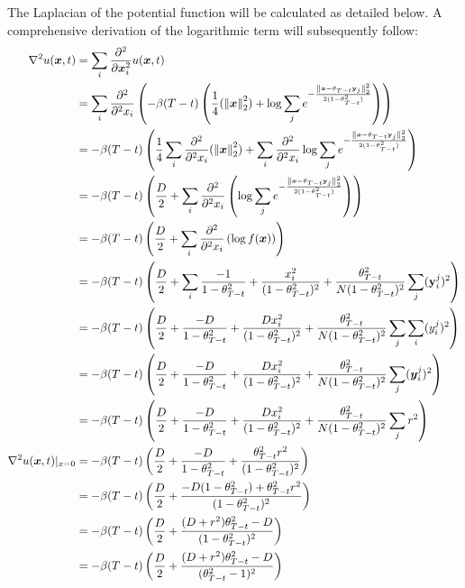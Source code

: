 The Laplacian of the potential function will be calculated as detailed below. A comprehensive derivation of the logarithmic term will subsequently follow:
\begin{align}
    \nabla^2 u(\boldsymbol{x}, t)&= \sum_i \frac{\partial^2}{\partial\boldsymbol{x}^2_i}u(\boldsymbol{x}, t)\nonumber\\
    &= \sum_i \frac{\partial^2}{\partial^2 x_i} \left( - \beta(T-t)
 \left(\frac{1}{4} ( {\left\lVert\boldsymbol{x}\right\rVert}_{2}^2 ) +    \log{\sum_j e^{-\frac{{\left\lVert\boldsymbol{x} -  \theta_{T - t}\mathbf{y}_j\right\rVert}_{2}^2}{2 ( 1 - \theta_{T-t}^2)}} } \right)\right) \nonumber\\
 &= - \beta(T - t) \left( \frac{1}{4} \sum_i \frac{\partial^2}{\partial^2 x_i}( {\left\lVert\boldsymbol{x}\right\rVert}_{2}^2 ) +   \sum_i \frac{\partial^2}{\partial^2 x_i} \log{\sum_j e^{-\frac{{\left\lVert\boldsymbol{x} -  \theta_{T - t}\mathbf{y}_j\right\rVert}_{2}^2}{2 ( 1 - \theta_{T-t}^2)}} } \right) \nonumber\\
 &=  - \beta(T - t)
 \left(\frac{D}{2} + \sum_i\frac{\partial^2}{\partial^2 x_i} \left( \log{\sum_j e^{-\frac{{\left\lVert\boldsymbol{x} -  \theta_{T - t}\mathbf{y}_j\right\rVert}_{2}^2}{2 ( 1 - \theta_{T-t}^2)}} } \right)\right) \nonumber\\
 &=  - \beta(T - t)
 \left(\frac{D}{2} + \sum_i\frac{\partial^2}{\partial^2 x_i} \left( \log{f(\boldsymbol{x}} )\right)\right) \nonumber\\
 &=  - \beta(T - t)
 \left(\frac{D}{2} + \sum_i \frac{-1}{1 - \theta_{T-t}^2}  +
        \frac{x_i^2}{(1 - \theta_{T-t}^2)^2}+
        \frac{\theta_{T - t}^2}{N(1 - \theta_{T-t}^2)^2}  \sum_j(\mathbf{y}_i^j)^2  \right) \nonumber\\
 &=  - \beta(T - t)
 \left(\frac{D}{2} +  \frac{-D}{1 - \theta_{T-t}^2}  +
        \frac{D x_i^2}{(1 - \theta_{T-t}^2)^2}+
        \frac{\theta_{T - t}^2}{N(1 - \theta_{T-t}^2)^2}  \sum_j\sum_i(y_i^j)^2  \right) \nonumber\\
 &=  - \beta(T - t)
 \left(\frac{D}{2} +  \frac{-D}{1 - \theta_{T-t}^2}  +
        \frac{D x_i^2}{(1 - \theta_{T-t}^2)^2}+
        \frac{\theta_{T - t}^2}{N(1 - \theta_{T-t}^2)^2}  \sum_j (\boldsymbol{y}_i^j)^2  \right) \nonumber\\
&=  - \beta(T - t)
 \left(\frac{D}{2} +  \frac{-D}{1 - \theta_{T-t}^2}  +
        \frac{D x_i^2}{(1 - \theta_{T-t}^2)^2}+
        \frac{\theta_{T - t}^2}{N(1 - \theta_{T-t}^2)^2}  \sum_j r^2  \right) \nonumber\\
\nabla^2 u(\boldsymbol{x}, t)|_{x=0} &=  - \beta(T - t) 
 \left(\frac{D}{2} +  \frac{-D}{1 - \theta_{T-t}^2} + \frac{\theta_{T - t}^2 r^2}{(1 - \theta_{T-t}^2)^2}\right) \nonumber\\
 &=  - \beta(T - t)
 \left(\frac{D}{2} +  \frac{-D(1 - \theta_{T-t}^2) + \theta_{T - t}^2 r^2}{(1 - \theta_{T-t}^2)^2}\right) \nonumber\\
  &=  - \beta(T - t)
 \left(\frac{D}{2} +  \frac{ (D  +  r^2)\theta_{T - t}^2 -D}{(1 - \theta_{T-t}^2)^2}\right) \nonumber\\
 &=  - \beta(T - t)
 \left(\frac{D}{2} +  \frac{ (D  +  r^2)\theta_{T - t}^2 -D}{(\theta_{T-t}^2 - 1)^2}\right) \nonumber\\
\end{align}



